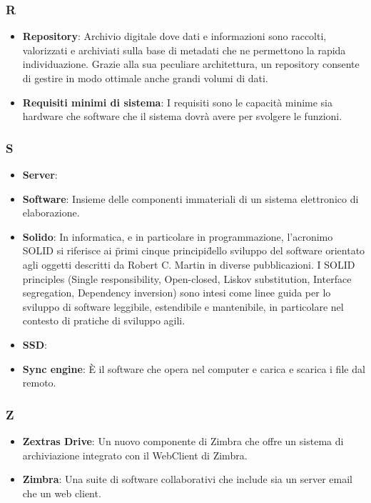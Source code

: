 \subsubsection{R}
\begin{itemize}
	\item \textbf{Repository}: Archivio digitale dove dati e informazioni sono raccolti, valorizzati e archiviati sulla base di metadati che ne permettono la rapida individuazione. Grazie alla sua peculiare architettura, un repository consente di gestire in modo ottimale anche grandi volumi di dati.
	\item \textbf{Requisiti minimi di sistema}: I requisiti sono le capacità minime sia hardware che software che il sistema dovrà avere per svolgere le funzioni.
\end{itemize}

\subsubsection{S}
\begin{itemize}
	\item \textbf{Server}:
	\item \textbf{Software}: Insieme delle componenti immateriali di un sistema elettronico di elaborazione.
	\item \textbf{Solido}: In informatica, e in particolare in programmazione, l'acronimo SOLID si riferisce ai \"primi cinque principi\" dello sviluppo del software orientato agli oggetti descritti da Robert C. Martin in diverse pubblicazioni. I SOLID principles (Single responsibility, Open-closed, Liskov substitution, Interface segregation, Dependency inversion) sono intesi come linee guida per lo sviluppo di software leggibile, estendibile e mantenibile, in particolare nel contesto di pratiche di sviluppo agili.
	\item \textbf{SSD}:
	\item \textbf{Sync engine}: È il software che opera nel computer e carica e scarica i file dal remoto.
\end{itemize}

\subsubsection{Z}
\begin{itemize}
	\item \textbf{Zextras Drive}: Un nuovo componente di Zimbra che offre un sistema di archiviazione integrato con il WebClient di Zimbra. 
	\item \textbf{Zimbra}: Una suite di software collaborativi che include sia un server email che un web client.
\end{itemize}
\appendix